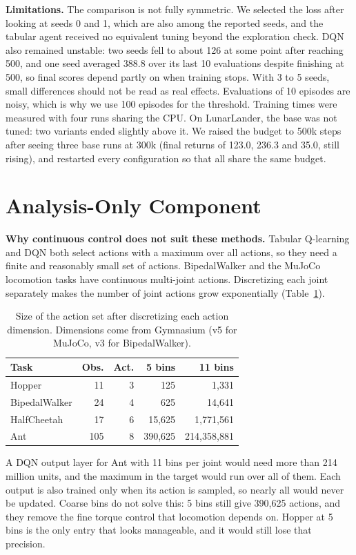 \documentclass[10pt,twocolumn]{article}
\begin{document}
\textbf{Limitations.} The comparison is not fully symmetric. We selected the loss after looking at seeds 0 and 1, which are also among the reported seeds, and the tabular agent received no equivalent tuning beyond the exploration check. DQN also remained unstable: two seeds fell to about 126 at some point after reaching 500, and one seed averaged 388.8 over its last 10 evaluations despite finishing at 500, so final scores depend partly on when training stops. With 3 to 5 seeds, small differences should not be read as real effects. Evaluations of 10 episodes are noisy, which is why we use 100 episodes for the threshold. Training times were measured with four runs sharing the CPU. On LunarLander, the base was not tuned: two variants ended slightly above it. We raised the budget to 500k steps after seeing three base runs at 300k (final returns of 123.0, 236.3 and 35.0, still rising), and restarted every configuration so that all share the same budget.

\section{Analysis-Only Component}
\textbf{Why continuous control does not suit these methods.} Tabular Q-learning and DQN both select actions with a maximum over all actions, so they need a finite and reasonably small set of actions. BipedalWalker and the MuJoCo locomotion tasks have continuous multi-joint actions. Discretizing each joint separately makes the number of joint actions grow exponentially (Table~\ref{tab:actions}).

\begin{table}[t]
\centering\small
\caption{Size of the action set after discretizing each action dimension. Dimensions come from Gymnasium (v5 for MuJoCo, v3 for BipedalWalker).}
\label{tab:actions}
\begin{tabular}{lrrrr}
\toprule
Task & Obs. & Act. & 5 bins & 11 bins \\
\midrule
Hopper & 11 & 3 & 125 & 1,331 \\
BipedalWalker & 24 & 4 & 625 & 14,641 \\
HalfCheetah & 17 & 6 & 15,625 & 1,771,561 \\
Ant & 105 & 8 & 390,625 & 214,358,881 \\
\bottomrule
\end{tabular}
\end{table}

A DQN output layer for Ant with 11 bins per joint would need more than 214 million units, and the maximum in the target would run over all of them. Each output is also trained only when its action is sampled, so nearly all would never be updated. Coarse bins do not solve this: 5 bins still give 390,625 actions, and they remove the fine torque control that locomotion depends on. Hopper at 5 bins is the only entry that looks manageable, and it would still lose that precision.
\end{document}

